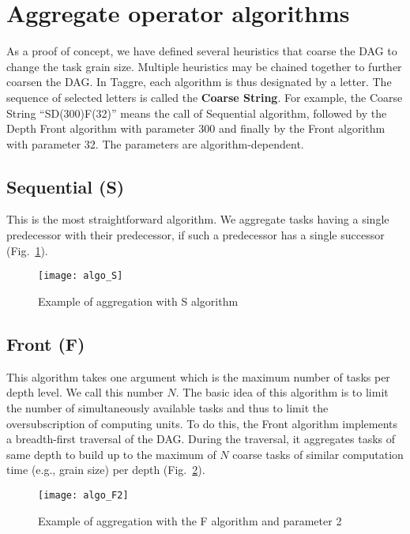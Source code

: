 \section{Aggregate operator algorithms}

As a proof of concept, we have defined several heuristics that
coarse the DAG to change the task grain size.
Multiple heuristics may be
chained together to further coarsen the DAG. In Taggre, each algorithm is
thus designated by a letter. The sequence of selected letters is
called the  {\bf Coarse String}. For example, the Coarse String
``SD(300)F(32)'' means the call of Sequential algorithm, followed
by the Depth Front algorithm with parameter 300 and finally by the
Front algorithm with parameter 32. The parameters are
algorithm-dependent.

\subsection{Sequential (S)}
This is the most straightforward algorithm.
%
We aggregate tasks having a single predecessor with their predecessor, if such a predecessor has a single successor (Fig.~\ref{fig:S_algo}).
\begin{figure}[!ht]
  \centering
  \texttt{[image: algo\_S]}
  \caption{Example of aggregation with S algorithm}
  \label{fig:S_algo}
\end{figure}


\subsection{Front (F)}
This algorithm takes one argument which is the maximum number of
tasks per depth level. We call this number $N$. The basic idea of
this algorithm is to limit the number of simultaneously available
tasks and thus to limit the oversubscription of computing units.
To do this, the Front algorithm implements a breadth-first traversal
of the DAG. During the traversal, it aggregates tasks of same
depth to build up to the maximum of $N$ coarse tasks of similar computation
time (e.g., grain size) per depth (Fig.~\ref{fig:F_algo}).

\begin{figure}[!ht]
  \centering
  \texttt{[image: algo\_F2]}
  \caption{Example of aggregation with the F algorithm and parameter 2}
  \label{fig:F_algo}
\end{figure}


